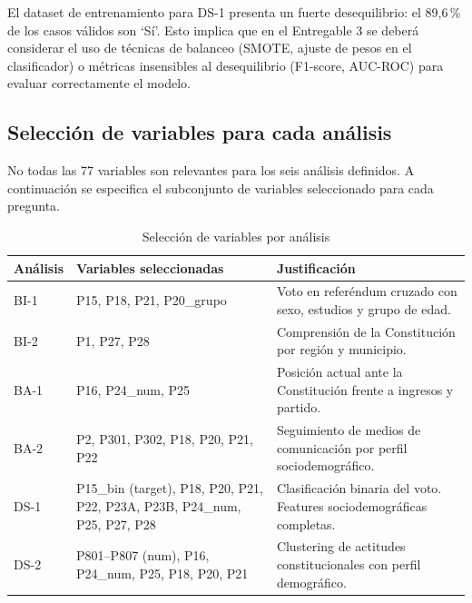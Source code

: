 \documentclass[12pt,a4paper]{article}
\newcommand{\thead}[1]{\cellcolor{tableheader}\color{white}\textbf{#1}}
\begin{document}
\begin{notebox}
El dataset de entrenamiento para DS-1 presenta un fuerte desequilibrio: el 89,6\,\% de los casos válidos son `Sí'. Esto implica que en el Entregable 3 se deberá considerar el uso de técnicas de balanceo (SMOTE, ajuste de pesos en el clasificador) o métricas insensibles al desequilibrio (F1-score, AUC-ROC) para evaluar correctamente el modelo.
\end{notebox}

\newpage

\subsection{Selección de variables para cada análisis}

No todas las 77 variables son relevantes para los seis análisis definidos. A continuación se especifica el subconjunto de variables seleccionado para cada pregunta.

\begin{table}[H]
\centering
\renewcommand{\arraystretch}{1.5}
\begin{tabularx}{\linewidth}{p{1.2cm} p{8cm} X}
\toprule
\thead{Análisis} & \thead{Variables seleccionadas} & \thead{Justificación} \\
\midrule
BI-1 & P15, P18, P21, P20\_grupo & Voto en referéndum cruzado con sexo, estudios y grupo de edad. \\
\rowcolor{tablerow}
BI-2 & P1, P27, P28 & Comprensión de la Constitución por región y municipio. \\
BA-1 & P16, P24\_num, P25 & Posición actual ante la Constitución frente a ingresos y partido. \\
\rowcolor{tablerow}
BA-2 & P2, P301, P302, P18, P20, P21, P22 & Seguimiento de medios de comunicación por perfil sociodemográfico. \\
DS-1 & P15\_bin (target), P18, P20, P21, P22, P23A, P23B, P24\_num, P25, P27, P28 & Clasificación binaria del voto. Features sociodemográficas completas. \\
\rowcolor{tablerow}
DS-2 & P801--P807 (num), P16, P24\_num, P25, P18, P20, P21 & Clustering de actitudes constitucionales con perfil demográfico. \\
\bottomrule
\end{tabularx}
\caption{Selección de variables por análisis}
\end{table}

\newpage

\end{document}
